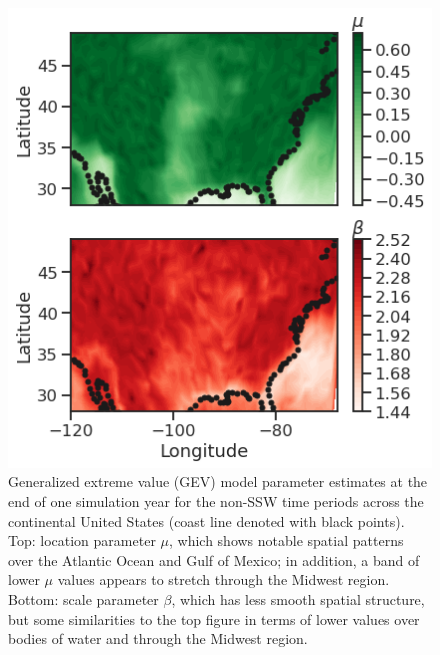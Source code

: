 \documentclass{juliacon}
\begin{document}
\begin{figure}
    \centering
    \includegraphics[width=0.8\linewidth]{figures/ssw_results.png}
    \caption{Generalized extreme value (GEV) model parameter estimates at the end of one simulation year for the non-SSW time periods across the continental United States (coast line denoted with black points). Top: location parameter $\mu$, which shows notable spatial patterns over the Atlantic Ocean and Gulf of Mexico; in addition, a band of lower $\mu$ values appears to stretch through the Midwest region. Bottom: scale parameter $\beta$, which has less smooth spatial structure, but some similarities to the top figure in terms of lower values over bodies of water and through the Midwest region.}
    \label{fig:ssw_results}
\end{figure}
\end{document}
